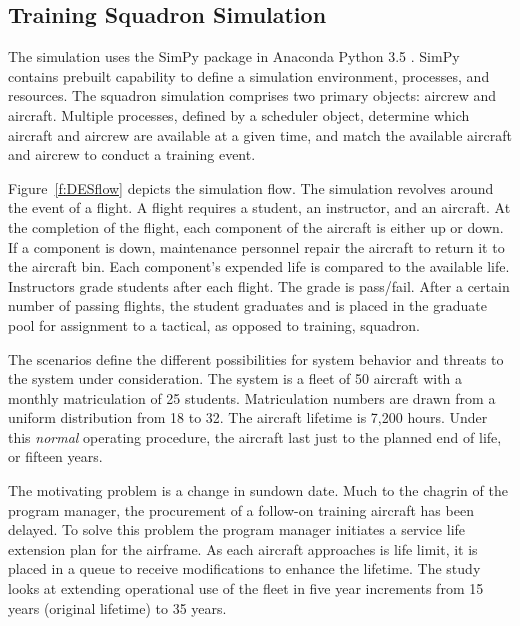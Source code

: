 \documentclass[preprint,12pt]{elsarticle}
\begin{document}
\subsection{Training Squadron Simulation}

The simulation uses the SimPy \cite{Scherfke2018} package in Anaconda
% 
% 
% 
% 
Python 3.5 \cite{Anaconda2016}. SimPy contains 
prebuilt capability to define a simulation environment, processes, and
resources. The squadron simulation comprises two primary objects: aircrew and
aircraft. Multiple processes, defined by a scheduler object, determine
which aircraft and aircrew are available at a given time, and match
the available aircraft and aircrew to conduct a training event.

Figure~\ref{f:DESflow} depicts the simulation flow. The simulation
revolves around the event of a flight.  A flight requires a student,
an instructor, and an aircraft. At the completion of the flight, each
component of the aircraft is either up or down. If a component is
down, maintenance personnel repair the aircraft to return it to the
aircraft bin. Each component's expended life is compared to the
available life. Instructors grade students after each flight. The
grade is pass/fail. After a certain number of passing flights, the
student graduates and is placed in the graduate pool for assignment to
a tactical, as opposed to training, squadron.

The scenarios define the different possibilities for system behavior
and threats to the system under consideration. The system is a fleet
of 50 aircraft with a monthly matriculation of
25 students. Matriculation numbers are drawn from a uniform
distribution from 18 to 32.  The aircraft lifetime is 7,200 hours. Under this
\emph{normal} operating procedure, the  
aircraft last just to the planned end of life, or fifteen years.

The motivating problem is a change in sundown date. Much to the
chagrin of the program manager, the procurement of a follow-on
training aircraft has been delayed. To solve this problem the program manager
initiates a service life extension plan for the airframe. As each
aircraft approaches is life limit, it is placed in a queue to receive
modifications to enhance the lifetime. The study looks at extending
operational use of the fleet in five year increments from 15 years
(original lifetime) to 35 years.
\end{document}
